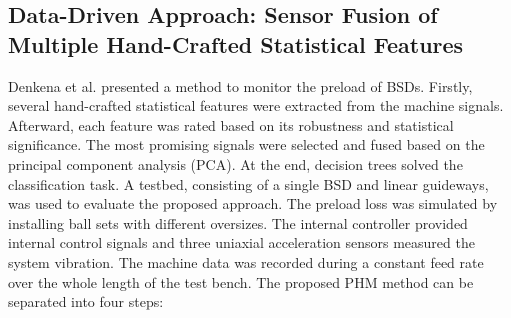 \subsection{Data-Driven Approach: Sensor Fusion of Multiple Hand-Crafted Statistical Features}

Denkena et al. \cite{Denkena2021} presented a method to monitor the preload of BSDs. Firstly, several hand-crafted statistical features were extracted from the machine signals. Afterward, each feature was rated based on its robustness and statistical significance. The most promising signals were selected and fused based on the principal component analysis (PCA). At the end, decision trees solved the classification task. A testbed, consisting of a single BSD and linear guideways, was used to evaluate the proposed approach. The preload loss was simulated by installing ball sets with different oversizes. The internal controller provided internal control signals and three uniaxial acceleration sensors measured the system vibration. The machine data was recorded during a constant feed rate over the whole length of the test bench. The proposed PHM method can be separated into four steps:

